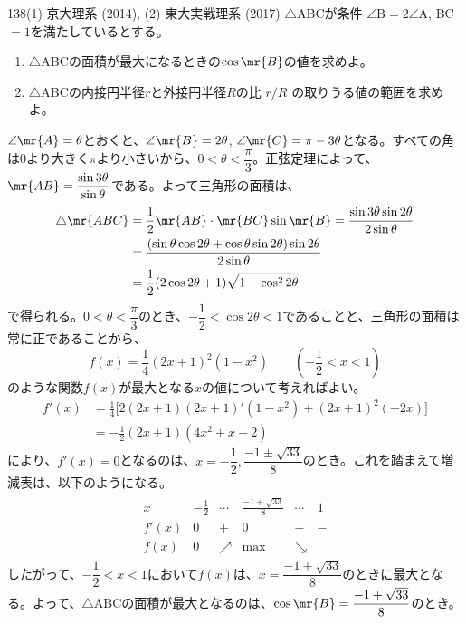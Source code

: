 \begin{thm}{138}{}{(1) 京大理系 (2014), (2) 東大実戦理系 (2017)}
 $\triangle$ABCが条件 $\angle{\mbox{B}}=2\angle{\mbox{A}}$, BC$=1$を満たしているとする。
 \begin{enumerate}
  \item $\triangle$ABCの面積が最大になるときの$\cos\mr{B}$の値を求めよ。
  \item $\triangle$ABCの内接円半径$r$と外接円半径$R$の比 $r/R$ の取りうる値の範囲を求めよ。
 \end{enumerate}
\end{thm}

$\angle\mr{A}=\theta$とおくと、$\angle\mr{B}=2\theta$, $\angle\mr{C}=\pi-3\theta$となる。すべての角は0より大きく$\pi$より小さいから、$0<\theta<\dfrac{\pi}{3}$。正弦定理によって、$\mr{AB}=\dfrac{\sin3\theta}{\sin\theta}$である。よって三角形の面積は、
\begin{align*}
 \triangle\mr{ABC}&=\frac{1}{2}\mr{AB}\cdot\mr{BC}\sin\mr{B}=\frac{\sin3\theta\sin2\theta}{2\sin\theta} \\
 &=\frac{(\sin\theta\cos2\theta+\cos\theta\sin2\theta)\sin2\theta}{2\sin\theta} \\
 &=\frac{1}{2}(2\cos2\theta+1)\sqrt{1-\cos^22\theta}
\end{align*}
で得られる。$0<\theta<\dfrac{\pi}{3}$のとき、$-\dfrac{1}{2}<\cos2\theta<1$であることと、三角形の面積は常に正であることから、
\[ f(x)=\frac{1}{4}(2x+1)^2(1-x^2) \qquad \left(-\frac{1}{2}<x<1\right) \]
のような関数$f(x)$が最大となる$x$の値について考えればよい。
\begin{align*}
 f'(x)&=\frac{1}{4}\bigl[2(2x+1)(2x+1)'(1-x^2)+(2x+1)^2(-2x)\bigr] \\
 &=-\frac{1}{2}(2x+1)(4x^2+x-2)
\end{align*}
により、$f'(x)=0$となるのは、$x=-\dfrac{1}{2}, \dfrac{-1\pm\sqrt{33}}{8}$のとき。これを踏まえて増減表は、以下のようになる。
\begin{align*}
 \begin{array}{c|c|c|c|c|c}
  x & -\frac{1}{2} & \cdots & \frac{-1+\sqrt{33}}{8}& \cdots & 1 \\ \hline
  f'(x) & 0 & + & 0 & - & - \\ \hline
  f(x) & 0 & \nearrow & \text{max} & \searrow & 
 \end{array}
\end{align*}
したがって、$-\dfrac{1}{2}<x<1$において$f(x)$は、$x=\dfrac{-1+\sqrt{33}}{8}$のときに最大となる。よって、$\triangle$ABCの面積が最大となるのは、$\cos\mr{B}=\dfrac{-1+\sqrt{33}}{8}$のとき。

